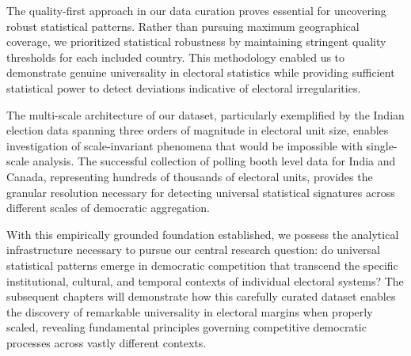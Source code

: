 The quality-first approach in our data curation proves essential for uncovering robust statistical patterns. Rather than pursuing maximum geographical coverage, we prioritized statistical robustness by maintaining stringent quality thresholds for each included country. This methodology enabled us to demonstrate genuine universality in electoral statistics while providing sufficient statistical power to detect deviations indicative of electoral irregularities.

The multi-scale architecture of our dataset, particularly exemplified by the Indian election data spanning three orders of magnitude in electoral unit size, enables investigation of scale-invariant phenomena that would be impossible with single-scale analysis. The successful collection of polling booth level data for India and Canada, representing hundreds of thousands of electoral units, provides the granular resolution necessary for detecting universal statistical signatures across different scales of democratic aggregation.

With this empirically grounded foundation established, we possess the analytical infrastructure necessary to pursue our central research question: do universal statistical patterns emerge in democratic competition that transcend the specific institutional, cultural, and temporal contexts of individual electoral systems? The subsequent chapters will demonstrate how this carefully curated dataset enables the discovery of remarkable universality in electoral margins when properly scaled, revealing fundamental principles governing competitive democratic processes across vastly different contexts.
